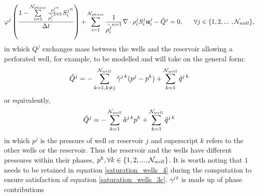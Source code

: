 \begin{equation}
\phi^j
\left(  \frac{  
1
-  
\sum\limits_{i=1}^{{\cal N}_{phase}} 
\frac{ {\rho_{i}^{j}}^{n} }
{  \tilde{\rho_{i}^{j}}^{n+1}  }
{S_i^{j}}^n
}
{\Delta t}
\right) 
+ 
\sum\limits_{i=1}^{{\cal N}_{phase}}
\frac{1}{  \tilde{\rho_{i}^{j}}^{n+1}   }
\nabla\cdot\rho_{i}^{j}S_i^{j}\mathbf{u}_i^{j} 
-\hat Q^j = 0, 
~~~~~ \forall j \in\{ 1,2,...~ , {\cal N}_{well}\}, 
\label{saturation_wells_4}
\end{equation}
in which $Q^j$ exchanges mass between the 
wells and the reservoir allowing a perforated well,  
for example, to be modelled and will take on the general form:
\begin{equation}
\hat Q^j = - \sum_{k=1, k\neq j}^{{\cal N}_{well}} 
\hat\gamma^{j \, k} (p^j - p^k)
+\sum_{k=1}^{{\cal N}_{well}} 
\hat q^{j \, k}
\label{saturation_wells_5}
\end{equation}
or equivalently, 
\begin{equation}
\hat Q^j = - \sum_{k=1}^{{\cal N}_{well}} 
\hat a^{j \, k} p^k
+\sum_{k=1}^{{\cal N}_{well}} 
\hat q^{j \, k}
\label{saturation_wells_5-a}
\end{equation}
in which $p^j$ is the pressure of well or reservoir $j$ and 
superscript $k$ refers to the other wells or the reservoir. 
Thus the reservoir and the wells have different pressures within 
their phases, $p^k, \forall k\in\{1,2,...,{\cal N}_{well}\}$. It is worth noting that 
$1$ needs to be retained in equation \ref{saturation_wells_4} during the computation to 
ensure satisfaction of equation \ref{saturation_wells_3c}. 
$\gamma^{j\,k}$ is made up of phase contributions

